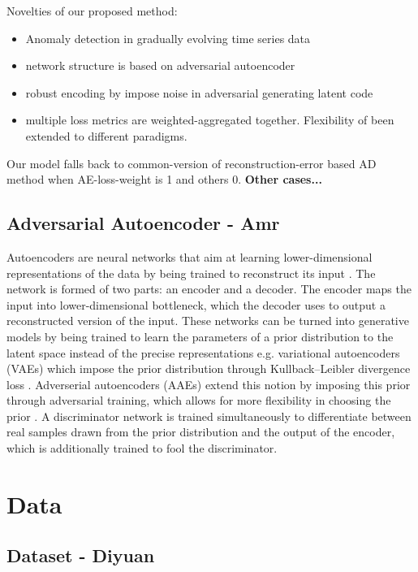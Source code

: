 \documentclass[pmlr]{jmlr}%
\begin{document}
Novelties of our proposed method:
\begin{itemize}
	\item Anomaly detection in gradually evolving time series data
	\item network structure is based on adversarial autoencoder
	\item robust encoding by impose noise in adversarial generating latent code
	\item multiple loss metrics are weighted-aggregated together. Flexibility of been extended to different paradigms. 
\end{itemize}
Our model falls back to common-version of reconstruction-error based AD method when AE-loss-weight is 1 and others 0. \textbf{Other cases...}



\subsection{Adversarial Autoencoder - Amr}
Autoencoders are neural networks that aim at learning lower-dimensional representations of the data by being trained to reconstruct its input \cite{Hinton2006}. The network is formed of two parts: an encoder and a decoder. The encoder maps the input into lower-dimensional bottleneck, which the decoder uses to output a reconstructed version of the input. These networks can be turned into generative models by being trained to learn the parameters of a prior distribution to the latent space instead of the precise representations e.g. variational autoencoders (VAEs) which impose the prior distribution through Kullback–Leibler divergence loss \cite{Kingma2013}. Adverserial autoencoders (AAEs) extend this notion by imposing this prior through adversarial training, which allows for more flexibility in choosing the prior \cite{makhzani2015adversarial}. A discriminator network is trained simultaneously to differentiate between real samples drawn from the prior distribution and the output of the encoder, which is additionally trained to fool the discriminator.  



\section{Data}
\subsection{Dataset - Diyuan}\label{dataset}
\end{document}
